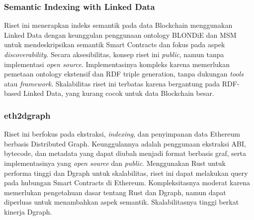 



\subsubsection{Semantic Indexing with Linked Data \parencite{third2017linked}}

Riset ini menerapkan indeks semantik pada data Blockchain menggunakan Linked Data dengan keunggulan penggunaan ontology BLONDiE dan MSM untuk mendeskripsikan semantik Smart Contracts dan fokus pada aspek \textit{discoverability}. Secara aksesibilitas, konsep riset ini \textit{public}, namun tanpa implementasi \textit{open source}. Implementasinya kompleks karena memerlukan pemetaan ontology ekstensif dan RDF triple generation, tanpa dukungan \textit{tools} atau \textit{framework}. Skalabilitas riset ini terbatas karena bergantung pada RDF-based Linked Data, yang kurang cocok untuk data Blockchain besar.

\subsubsection{eth2dgraph \parencite{aimar2023extraction}}

Riset ini berfokus pada ekstraksi, \textit{indexing}, dan penyimpanan data Ethereum berbasis Distributed Graph. Keunggulannya adalah penggunaan ekstraksi ABI, bytecode, dan metadata yang dapat diubah menjadi format berbasis graf, serta implementasinya yang \textit{open source} dan \textit{public}. Menggunakan Rust untuk performa tinggi dan Dgraph untuk skalabilitas, riset ini dapat melakukan query pada hubungan Smart Contracts di Ethereum. Kompleksitasnya moderat karena memerlukan pengetahuan dasar tentang Rust dan Dgraph, namun dapat diperluas untuk menambahkan aspek semantik. Skalabilitasnya tinggi berkat kinerja Dgraph.

